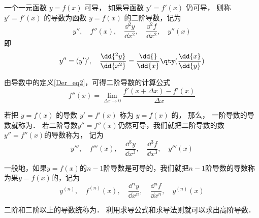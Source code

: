 

一个一元函数 $y=f(x)$ 可导， 如果导函数 $y'=f'(x)$ 仍可导， 则称 $y'=f'(x)$ 的导数为函数 $y=f(x)$ 的二阶导数，记为
\begin{equation}
y'',\quad f''(x),\quad \frac{\dd{^2y}}{\dd{x^2}},\quad \frac{\dd{^2f}}{\dd{x^2}},\quad y''(x)
\end{equation}
即
\begin{equation}
y''=(y')',\quad\frac{\dd{^2y}}{\dd{x^2}}=\frac{\dd{ }}{\dd{x}}\qty(\frac{\dd{x}}{\dd{y}})
\end{equation}

由导数中的定义\autoref{Der_eq2}，可得二阶导数的计算公式
\begin{equation}
f''(x)=\lim_{\Delta x \to 0} \frac{f'(x+ \Delta x)-f'(x)}{\Delta x}
\end{equation}

若把 $y=f(x)$ 的导数 $y'=f'(x)$ 称为 $y=f(x)$ 的， 那么， 一阶导数的导数就称为． 若二阶导数$y''=f''(x)$仍然可导，我们就把二阶导数的数$y''=f''(x)$的导数称为， 记为
\begin{equation}
y''',\quad f'''(x),\quad \frac{\dd{^3y}}{\dd{x^3}},\quad \frac{\dd{^3f}}{\dd{x^3}},\quad y'''(x)
\end{equation}

一般地，如果$y=f(x)$的$n-1$阶导数是可导的，我们就把$n-1$阶导数的导数称为果$y=f(x)$的，记为
\begin{equation}
y^{(n)},\quad f^{(n)}(x),\quad \frac{\dd{^ny}}{\dd{x^n}},\quad \frac{\dd{^nf}}{\dd{x^n}},\quad y^{(n)}(x)
\end{equation}

二阶和二阶以上的导数统称为． 利用求导公式和求导法则就可以求出高阶导数．
